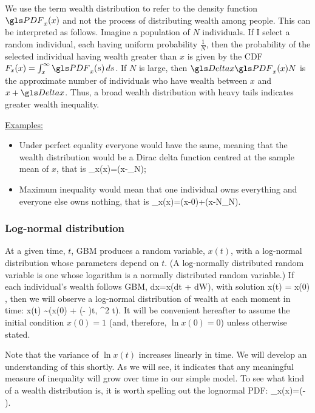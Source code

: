 We use the term wealth distribution to refer to the density function $\PDF_x(x)$ and not the process of distributing wealth among people. This can be interpreted as follows. Imagine a population of $N$ individuals. If I select a random individual, each having uniform probability $\frac{1}{N}$, then the probability of the selected individual having wealth greater than $x$ is given by the CDF $F_x(x)=\int_x^\infty \PDF_x(s)\,ds$. If $N$ is large, then $\D x \PDF_x(x)N$ is the approximate number of individuals who have wealth between $x$ and $x+\D x$. Thus, a broad wealth distribution with heavy tails indicates greater wealth inequality.

\underline{Examples:}
\begin{itemize}
\item Under perfect equality everyone would have the same, meaning that the wealth
distribution would be a Dirac delta function centred at the sample mean of $x$, that is
\be
\PDF_x(x)=\delta(x-_N);
\ee
\item
Maximum inequality would mean that one individual owns everything
and everyone else owns nothing, that is
\be 
\PDF_x(x)=\delta(x-0)+\delta(x-N_N).
\ee
\end{itemize}


\subsubsection{Log-normal distribution}
At a given time, $t$, GBM produces a random variable, $x(t)$, with a log-normal distribution whose parameters depend on $t$. (A log-normally distributed random variable is one whose logarithm is a normally distributed random variable.) If each individual's wealth follows GBM,
\be
dx=x(\mu dt + \sigma dW),
\ee
with solution 
\be
x(t) = x(0) \exp{},
\ee
then we will observe a log-normal distribution of wealth at each moment in time:
\be
\ln x(t) \sim {}\left(\ln x(0) + \left(\mu - \right)t, \sigma^2 t\right).
\ee
It will be convenient hereafter to assume the initial condition $x(0)=1$ (and, therefore, $\ln x(0)=0$) unless otherwise stated.

Note that the variance of $\ln x(t)$ increases linearly in time. We will develop an understanding of this shortly. As we will see, it indicates that any meaningful measure of inequality will grow over time in our simple model. To see what kind of a wealth distribution  is, it is worth spelling out the lognormal PDF:
\be
\PDF_x(x)=\exp\left(- \right).
\ee

